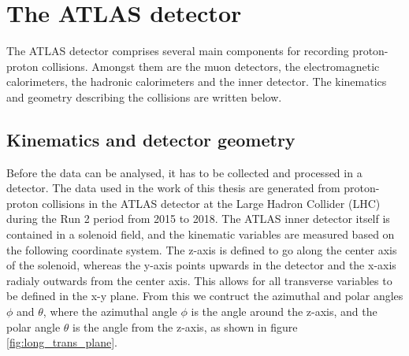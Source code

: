 \section{The ATLAS detector}
The ATLAS detector comprises several main components for recording proton-proton collisions. Amongst them are the muon detectors, 
the electromagnetic calorimeters, the hadronic calorimeters and the inner detector. The kinematics and geometry describing the collisions are 
written below.
\subsection*{Kinematics and detector geometry}
Before the data can be analysed, it has to be collected and processed in a detector. The data used in the work of this thesis 
are generated from proton-proton collisions in the ATLAS detector at the Large Hadron Collider (LHC) during the Run 2 period from 2015 to 2018. 
The ATLAS inner detector itself is contained in a solenoid field, 
and the kinematic variables are measured based on the following coordinate system. The z-axis is defined to go 
along the center axis of the solenoid, whereas the y-axis points upwards in the detector and the x-axis radialy 
outwards from the center axis. This allows for all transverse variables to be defined in the x-y plane\cite{Gramstad:1631043}. 
From this we contruct the azimuthal and polar angles $\phi$ and $\theta$, where the azimuthal angle $\phi$ is the angle around the z-axis, 
and the polar angle $\theta$ is the angle from the z-axis, as shown in figure \ref{fig:long_trans_plane}.



